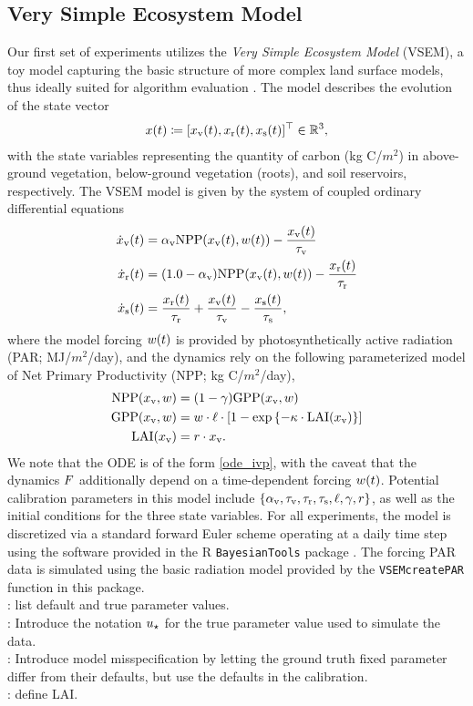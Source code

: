 \documentclass[12pt]{article}
\begin{document}
\subsection{Very Simple Ecosystem Model}
Our first set of experiments utilizes the \textit{Very Simple Ecosystem Model} (VSEM), a toy model capturing the basic 
structure of more complex land surface models, thus ideally suited for algorithm evaluation \citep{vsem}. The model 
describes the evolution of the state vector
\begin{align*}
x(t) \coloneqq [x_{\textrm{v}}(t), x_{\textrm{r}}(t), x_{\textrm{s}}(t)]^\top \in \mathbb{R}^{3}, 
\end{align*}
with the state variables representing the quantity of carbon (\textrm{kg C/$m^2$}) in above-ground vegetation, below-ground 
vegetation (roots), and soil reservoirs, respectively. The VSEM model is given by the system of coupled 
ordinary differential equations
\begin{align}
\dot{x}_{\textrm{v}}(t) &= \alpha_{\textrm{v}} \textrm{NPP}(x_{\textrm{v}}(t), w(t)) - \frac{x_{\textrm{v}}(t)}{\tau_{\textrm{v}}} \\
\dot{x}_{\textrm{r}}(t) &= (1.0 - \alpha_{\textrm{v}}) \textrm{NPP}(x_{\textrm{v}}(t), w(t)) - \frac{x_{\textrm{r}}(t)}{\tau_{\textrm{r}}} \nonumber \\ 
\dot{x}_{\textrm{s}}(t) &= \frac{x_{\textrm{r}}(t)}{\tau_{\textrm{r}}} + \frac{x_{\textrm{v}}(t)}{\tau_{\textrm{v}}} - \frac{x_{\textrm{s}}(t)}{\tau_{\textrm{s}}}, \nonumber
\end{align}
where the model forcing $w(t)$ is provided by photosynthetically active radiation 
(PAR; \textrm{MJ/$m^2$/day}), and the dynamics rely on the following parameterized model of 
Net Primary Productivity (NPP; \textrm{kg C/$m^2$/day}),
\begin{align}
\textrm{NPP}(x_{\textrm{v}}, w) &= (1 - \gamma) \textrm{GPP}(x_{\textrm{v}}, w) \\
\textrm{GPP}(x_{\textrm{v}}, w) &= w \cdot \ell \cdot \left[1 - \exp\left\{-\kappa \cdot \textrm{LAI}(x_{\textrm{v}}) \right\} \right] \nonumber \\
\textrm{LAI}(x_{\textrm{v}}) &= r \cdot x_{\textrm{v}}. \nonumber
\end{align} 
We note that the ODE is of the form \ref{ode_ivp}, with the caveat that the dynamics $F$ additionally depend on a 
time-dependent forcing $w(t)$. Potential calibration parameters in this model include 
$\{\alpha_{\textrm{v}}, \tau_{\textrm{v}}, \tau_{\textrm{r}}, \tau_{\textrm{s}}, \ell, \gamma, r\}$, as well as the initial conditions for the three state variables. 
For all experiments, the model is discretized via a standard forward Euler scheme operating at a daily time step using the 
software provided in the R \verb+BayesianTools+ package \citep{vsem}. The forcing PAR data is simulated using the basic
radiation model provided by the \verb+VSEMcreatePAR+ function in this package. \\
\todo: list default and true parameter values. \\
\todo: Introduce the notation $u_{\star}$ for the true parameter value used to simulate the data. \\
\todo: Introduce model misspecification by letting the ground truth fixed parameter differ from their defaults, but use the 
defaults in the calibration. \\
\todo: define LAI.
\end{document}

